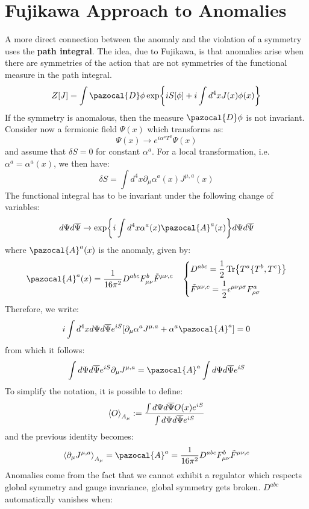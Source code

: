 \documentclass[../main.tex]{subfiles}
\begin{document}
\section{Fujikawa Approach to Anomalies}
A more direct connection between the anomaly and the violation of a symmetry uses the \textbf{path integral}. The idea, due to Fujikawa, is that anomalies arise when there are symmetries of the action that are not symmetries of the functional measure in the path integral. 
\[
Z[J]=\int\pazocal{D}\phi\exp{iS[\phi]+i\int d^4xJ(x)\phi(x)} 
\]
If the symmetry is anomalous, then the measure $\pazocal{D}\phi$ is not invariant. Consider now a fermionic field $\Psi(x)$ which transforms as:
\[
\Psi(x)\to e^{i\alpha^aT^a}\Psi(x)
\]
and assume that $\delta S=0$ for constant $\alpha^a$. For a local transformation, i.e. $\alpha^a=\alpha^a(x)$, we then have:
\[
\delta S=\int d^4x\partial_\mu\alpha^a(x)J^{\mu,a}(x)
\]
The functional integral has to be invariant under the following change of variables:
\[
d\Psi d\overline{\Psi}\to\exp{i\int d^4x\alpha^a(x)\pazocal{A}^a(x)}d\Psi d\overline{\Psi}
\]
where $\pazocal{A}^a(x)$ is the anomaly, given by:
\[
\pazocal{A}^a(x)=\frac{1}{16\pi^2}D^{abc}F_{\mu\nu}^b\Tilde{F}^{\mu\nu,c} \quad \left\{\begin{aligned}
&D^{abc}=\frac{1}{2}\Tr{T^a\{T^b,T^c\}}\\
&\Tilde{F}^{\mu\nu,c}=\frac{1}{2}\epsilon^{\mu\nu\rho\sigma}F_{\rho\sigma}^a
\end{aligned}\right.
\]
Therefore, we write:
\[
i\int d^4xd\Psi d\overline{\Psi}e^{iS}[\partial_\mu\alpha^aJ^{\mu,a}+\alpha^a\pazocal{A}^a]=0
\]
from which it follows:
\[
\int d\Psi d\overline{\Psi}e^{iS}\partial_\mu J^{\mu,a}=\pazocal{A}^a\int d\Psi d\overline{\Psi}e^{iS}
\]
To simplify the notation, it is possible to define:
\[
\Braket{O}_{A_\mu}:=\frac{\int d\Psi d\overline{\Psi}O(x)e^{iS}}{\int d\Psi d\overline{\Psi}e^{iS}}
\]
and the previous identity becomes:
\[
\Braket{\partial_\mu J^{\mu,a}}_{A_\mu}=\pazocal{A}^a=\frac{1}{16\pi^2}D^{abc}F_{\mu\nu}^b\Tilde{F}^{\mu\nu,c}
\]
Anomalies come from the fact that we cannot exhibit a regulator which respects global symmetry and gauge invariance, global symmetry gets broken.  $D^{abc}$ automatically vanishes when:
\end{document}
